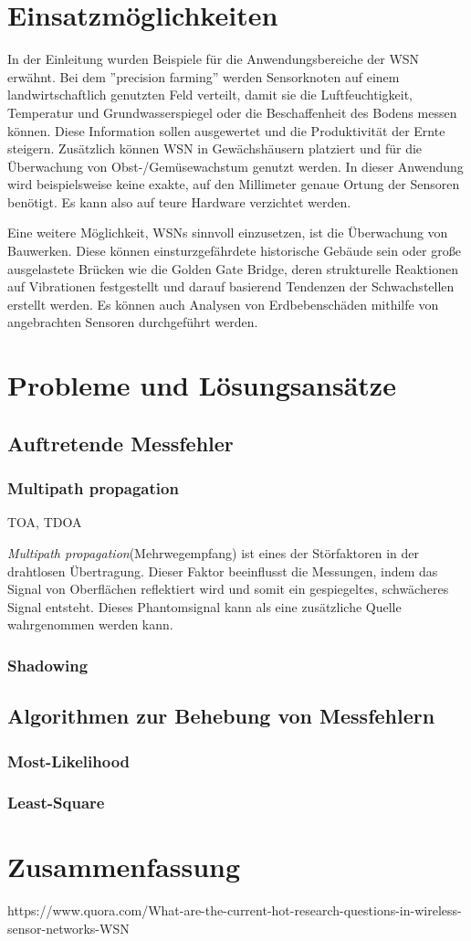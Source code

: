 \documentclass[12pt, a4wide]{scrreprt}
\begin{document}
\chapter{Einsatzmöglichkeiten}
In der Einleitung wurden Beispiele für die Anwendungsbereiche der \acs{WSN} erwähnt. Bei dem ''precision farming'' werden Sensorknoten auf einem landwirtschaftlich genutzten Feld verteilt, damit sie die Luftfeuchtigkeit, Temperatur und Grundwasserspiegel oder die Beschaffenheit des Bodens messen können. Diese Information sollen ausgewertet und die Produktivität der Ernte steigern. Zusätzlich können WSN in Gewächshäusern\cite{horticulture} platziert und für die Überwachung von Obst-/Gemüsewachstum genutzt werden. In dieser Anwendung wird beispielsweise keine exakte, auf den Millimeter genaue Ortung der Sensoren benötigt. Es kann also auf teure Hardware verzichtet werden.

Eine weitere Möglichkeit, WSNs sinnvoll einzusetzen, ist die Überwachung von Bauwerken. Diese können einsturzgefährdete historische Gebäude sein\cite{historical_monitoring} oder große ausgelastete Brücken wie die Golden Gate Bridge\cite{bridge_monitoring}, deren strukturelle Reaktionen auf Vibrationen festgestellt und darauf basierend Tendenzen der Schwachstellen erstellt werden. Es können auch Analysen von Erdbebenschäden mithilfe von angebrachten Sensoren durchgeführt werden.
\chapter{Probleme und Lösungsansätze}
  \section{Auftretende Messfehler}  
    \subsection{Multipath propagation}
TOA, TDOA

\textit{Multipath propagation}(Mehrwegempfang) ist eines der Störfaktoren in der drahtlosen Übertragung. Dieser Faktor beeinflusst die Messungen, indem das Signal von Oberflächen reflektiert wird und somit ein gespiegeltes, schwächeres Signal entsteht. Dieses Phantomsignal kann als eine zusätzliche Quelle wahrgenommen werden kann.
    \subsection{Shadowing}
  \section{Algorithmen zur Behebung von Messfehlern}
    \subsection{Most-Likelihood}
    \subsection{Least-Square}
\chapter{Zusammenfassung}
https://www.quora.com/What-are-the-current-hot-research-questions-in-wireless-sensor-networks-WSN
\newpage


\nocite{*}
\end{document}
